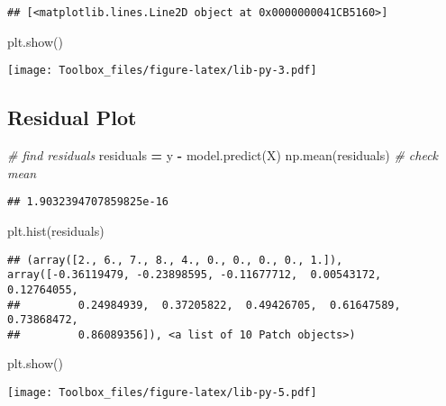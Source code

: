 \documentclass[
]{book}
\newenvironment{Shaded}{\begin{snugshade}}{\end{snugshade}}
\newcommand{\CommentTok}[1]{\textcolor[rgb]{0.56,0.35,0.01}{\textit{#1}}}
\newcommand{\NormalTok}[1]{#1}
\newcommand{\OperatorTok}[1]{\textcolor[rgb]{0.81,0.36,0.00}{\textbf{#1}}}
\begin{document}
\begin{verbatim}
## [<matplotlib.lines.Line2D object at 0x0000000041CB5160>]
\end{verbatim}

\begin{Shaded}
\begin{Highlighting}[]
\NormalTok{plt.show()}
\end{Highlighting}
\end{Shaded}

\texttt{[image: Toolbox\_files/figure-latex/lib-py-3.pdf]}

\hypertarget{residual-plot}{%
\subsection{Residual Plot}\label{residual-plot}}

\begin{Shaded}
\begin{Highlighting}[]
\CommentTok{\# find residuals}
\NormalTok{residuals }\OperatorTok{=}\NormalTok{ y }\OperatorTok{{-}}\NormalTok{ model.predict(X)}
\NormalTok{np.mean(residuals) }\CommentTok{\# check mean}
\end{Highlighting}
\end{Shaded}

\begin{verbatim}
## 1.9032394707859825e-16
\end{verbatim}

\begin{Shaded}
\begin{Highlighting}[]
\NormalTok{plt.hist(residuals)}
\end{Highlighting}
\end{Shaded}

\begin{verbatim}
## (array([2., 6., 7., 8., 4., 0., 0., 0., 0., 1.]), array([-0.36119479, -0.23898595, -0.11677712,  0.00543172,  0.12764055,
##         0.24984939,  0.37205822,  0.49426705,  0.61647589,  0.73868472,
##         0.86089356]), <a list of 10 Patch objects>)
\end{verbatim}

\begin{Shaded}
\begin{Highlighting}[]
\NormalTok{plt.show()}
\end{Highlighting}
\end{Shaded}

\texttt{[image: Toolbox\_files/figure-latex/lib-py-5.pdf]}
\end{document}
